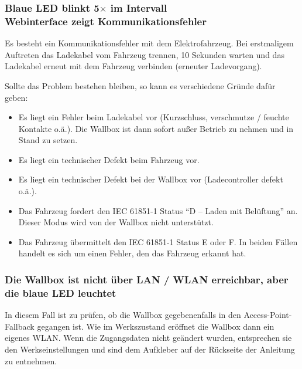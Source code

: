 \documentclass[a4paper,10pt]{article}
\begin{document}
\begin{multicols*}{2}
    \subsubsection*{Blaue LED blinkt 5$\times$ im Intervall \\ Webinterface zeigt Kommunikationsfehler}
    Es besteht ein Kommunikationsfehler mit dem Elektrofahrzeug. Bei erstmaligem
    Auftreten das Ladekabel vom Fahrzeug trennen, 10 Sekunden warten und das
    Ladekabel erneut mit dem Fahrzeug verbinden (erneuter Ladevorgang).

    Sollte das Problem bestehen bleiben, so kann es verschiedene Gründe dafür
    geben:
    \begin{itemize}
        \item Es liegt ein Fehler beim Ladekabel vor (Kurzschluss, verschmutze / feuchte
              Kontakte o.ä.). Die Wallbox ist dann sofort außer Betrieb zu nehmen und
              in Stand zu setzen.
        \item Es liegt ein technischer Defekt beim Fahrzeug vor.
        \item Es liegt ein technischer Defekt bei der Wallbox vor
			(Ladecontroller defekt o.ä.).
        \item Das Fahrzeug fordert den IEC 61851-1 Status \enquote{D – Laden mit Belüftung}
              an. Dieser Modus wird von der Wallbox nicht unterstützt.
        \item Das Fahrzeug übermittelt den IEC 61851-1 Status E oder F. In beiden Fällen
              handelt es sich um einen Fehler, den das Fahrzeug erkannt hat.
    \end{itemize}

    \subsubsection*{Die Wallbox ist nicht über LAN / WLAN erreichbar, aber die blaue LED leuchtet}
    In diesem Fall ist zu prüfen, ob die Wallbox gegebenenfalls in den Access-Point-Fallback
    gegangen ist. Wie im Werkszustand eröffnet die Wallbox dann ein eigenes
    WLAN. Wenn die Zugangsdaten nicht geändert wurden, entsprechen sie den Werkseinstellungen und sind dem
    Aufkleber auf der Rückseite der Anleitung zu entnehmen.



\end{multicols*}
\end{document}
